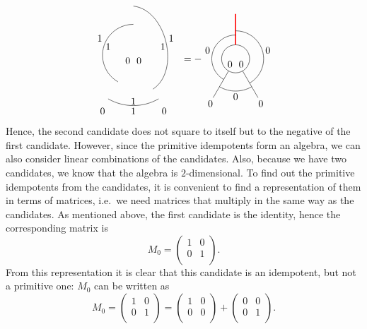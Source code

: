 \begin{equation*}
\begin{tikzpicture}[scale=1,baseline=(current bounding box.center)]
			\draw ([shift=(240:1.1cm)]0,0) arc (240:90:1.1cm);
			\draw ([shift=(-60:1.4cm)]0,0) to [bend right=70] ([shift=(90:1.75cm)]0,0);
			\draw ([shift=(-120:1.8cm)]0,0) arc (-120:-60:1.8cm);
			\node at (0.2,-0.2) {$0$};
			\node at (-0.2,-0.2) {$0$};
			\node at (-1.1,-2) {$0$};
			\node at (1.1,-2) {$0$};
			\node at (-0.9,0.3) {$1$};
			\node at (1.05,0.3) {$1$};
			\node at (0,-1.65) {$1$};
			\node at (-1.2,0.6) {$1$};
			\node at (1.35,0.6) {$1$};
			\node at (0,-2) {$1$};
		\end{tikzpicture}
		=-\begin{tikzpicture}[scale=1,baseline=(current bounding box.center)]
			\draw (0,0) circle (0.5cm);
			\draw
			\foreach \a in {-60, -120} {
				(\a:0.5) -- (\a:1.6)
			};
			\draw[red,line width=0.4mm] (90:0.5) -- (90:1.6);
			\draw ([shift=(-60:1cm)]0,0) arc (-60:90:1cm);
			\draw ([shift=(-120:1.15cm)]0,0) arc (-120:-60:1.15cm);
			\draw ([shift=(240:0.85cm)]0,0) arc (240:90:0.85cm);
			\node at (0.2,-0.2) {$0$};
			\node at (-0.2,-0.2) {$0$};
			\node at (-0.9,-1.6) {$0$};
			\node at (0.9,-1.6) {$0$};
			\node at (-1,0.3) {$0$};
			\node at (1.15,0.3) {$0$};
			\node at (0,-1.35) {$0$};
		\end{tikzpicture}\vspace{5pt}
	\end{equation*}
Hence, the second candidate does not square to itself but to the negative of the first candidate. However, since the primitive idempotents form an algebra, we can also consider linear combinations of the candidates. Also, because we have two candidates, we know that the algebra is $2$-dimensional. To find out the primitive idempotents from the candidates, it is convenient to find a representation of them in terms of matrices, i.e.\ we need matrices that multiply in the same way as the candidates. As mentioned above, the first candidate is the identity, hence the corresponding matrix is
	\begin{equation}
		M_0=\begin{pmatrix}
			1 & 0\\
			0 & 1\\
		\end{pmatrix}.
	\end{equation}
From this representation it is clear that this candidate is an idempotent, but not a primitive one: $M_0$ can be written as
	\begin{equation}
	\label{eq_M0}
		M_0=\begin{pmatrix}
			1 & 0\\
			0 & 1\\
		\end{pmatrix}
		=\begin{pmatrix}
			1 & 0\\
			0 & 0\\
		\end{pmatrix}
		+\begin{pmatrix}
			0 & 0\\
			0 & 1\\
		\end{pmatrix}.
	\end{equation}
